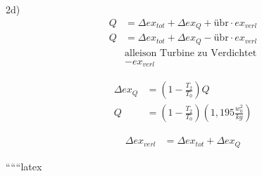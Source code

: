 2d) 
\begin{align*}
Q &= \Delta ex_{tot} + \Delta ex_Q + \text{übr} \cdot ex_{verl} \\
Q &= \Delta ex_{tot} + \Delta ex_Q - \text{übr} \cdot ex_{verl} \\
&\text{alleison Turbine zu Verdichtet} \\
&- ex_{verl}
\end{align*}

\begin{align*}
\Delta ex_Q &= \left( 1 - \frac{T_2}{T_0} \right) Q \\
Q &= \left( 1 - \frac{T_2}{T_0} \right) \left( 1,195 \frac{w_0^2}{kg} \right)
\end{align*}

\begin{align*}
\Delta ex_{verl} &= \Delta ex_{tot} + \Delta ex_Q
\end{align*}

``````latex